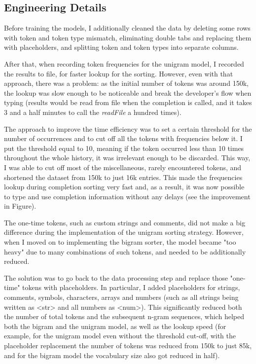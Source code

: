 \documentclass[sigplan,screen]{acmart}
\begin{document}
\subsection{Engineering Details}
Before training the models, I additionally cleaned the data by deleting some rows with token and token type mismatch, eliminating double tabs and replacing them with placeholders, and splitting token and token types into separate columns.

After that, when recording token frequencies for the unigram model, I recorded the results to file, for faster lookup for the sorting. However, even with that approach, there was a problem: as the initial number of tokens was around 150k, the lookup was slow enough to be noticeable and break the developer's flow when typing (results would be read from file when the completion is called, and it takes 3 and a half minutes to call the \textit{readFile} a hundred times).

The approach to improve the time efficiency was to set a certain threshold for the number of occurrences and to cut off all the tokens with frequencies below it. I put the threshold equal to 10, meaning if the token occurred less than 10 times throughout the whole history, it was irrelevant enough to be discarded. This way, I was able to cut off most of the miscellaneous, rarely encountered tokens, and shortened the dataset from 150k to just 16k entries. This made the frequencies lookup during completion sorting very fast and, as a result, it was now possible to type and use completion information without any delays (see the improvement in Figure).

The one-time tokens, such as custom strings and comments, did not make a big difference during the implementation of the unigram sorting strategy. However, when I moved on to implementing the bigram sorter, the model became "too heavy" due to many combinations of such tokens, and needed to be additionally reduced.

The solution was to go back to the data processing step and replace those "one-time" tokens with placeholders. In particular, I added placeholders for strings, comments, symbols, characters, arrays and numbers (such as all strings being written as <str> and all numbers as <num>). This significantly reduced both the number of total tokens and the subsequent n-gram sequences, which helped both the bigram and the unigram model, as well as the lookup speed (for example, for the unigram model even without the threshold cut-off, with the placeholder replacement the number of tokens was reduced from 150k to just 85k, and for the bigram model the vocabulary size also got reduced in half).
\end{document}
